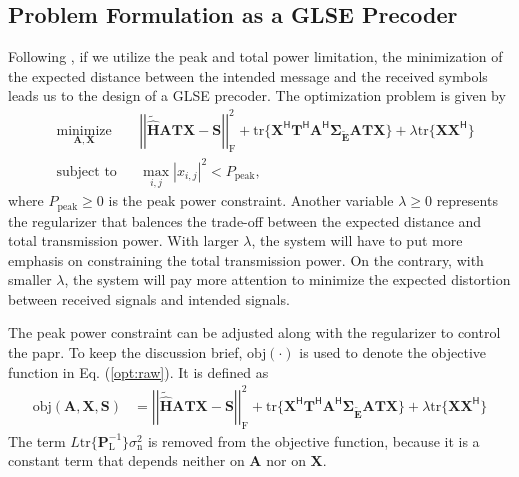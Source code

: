 \documentclass[12pt,draftclsnofoot,onecolumn,journal]{IEEEtran}
\begin{document}
\subsection{Problem Formulation as a GLSE Precoder}
Following \cite{glse}, if we utilize the peak and total power limitation, the minimization of the expected distance between the intended message and the received symbols leads us to the design of a GLSE precoder. The optimization problem is given by
\begin{equation}
\begin{aligned}
& \underset{\mathbf A, \mathbf X}{\text{minimize}}
& &\left|\left|\tilde{\hat{\mathbf H}}\mathbf{ATX}-\mathbf{S}\right|\right|_{\mathrm{F}}^2+\mathrm{tr}\{\mathbf X^{\mathsf H}\mathbf T^{\mathsf H}\mathbf A^{\mathsf H}
\pmb{\Sigma_{\tilde{\mathbf E}}}\mathbf{ATX}\}+\lambda\mathrm{tr}\{\mathbf X\mathbf X^{\mathsf H}\}\\
& \text{subject to}
& &\max_{i,j} |x_{i,j}|^2<P_{\mathrm{peak}},
\label{opt:raw}
\end{aligned}
\end{equation}
where $P_{\mathrm{peak}}\geq 0$ is the peak power constraint. Another variable $\lambda\geq 0$ represents the regularizer that balences the trade-off between the expected distance and total transmission power. With larger $\lambda$, the system will have to put more emphasis on constraining the total transmission power. On the contrary, with smaller $\lambda$, the system will pay more attention to minimize the expected distortion between received signals and intended signals. 

The peak power constraint can be adjusted along with the regularizer to control the \ac{papr}.
To keep the discussion brief, $\mathrm{obj}(\cdot)$ is used to denote the objective function in Eq. (\ref{opt:raw}). It is defined as
\begin{equation}
\begin{split}
\mathrm{obj}(\mathbf A, \mathbf X, \mathbf S)&=\left|\left|\tilde{\hat{\mathbf H}}\mathbf{ATX}-\mathbf{S}\right|\right|_{\mathrm{F}}^2+\mathrm{tr}\{\mathbf X^{\mathsf H}\mathbf T^{\mathsf H}\mathbf A^{\mathsf H}
\pmb{\Sigma_{\tilde{\mathbf E}}}\mathbf{ATX}\}+\lambda\mathrm{tr}\{\mathbf X\mathbf X^{\mathsf H}\}
\label{eq:objfunc}
\end{split}
\end{equation}
The term $L\mathrm{tr}\{\mathbf P_{\mathrm L}^{-1}\}\sigma_{\mathrm n}^2$ is removed from the objective function, because it is a constant term that depends neither on $\mathbf A$ nor on $\mathbf X$.
\end{document}
